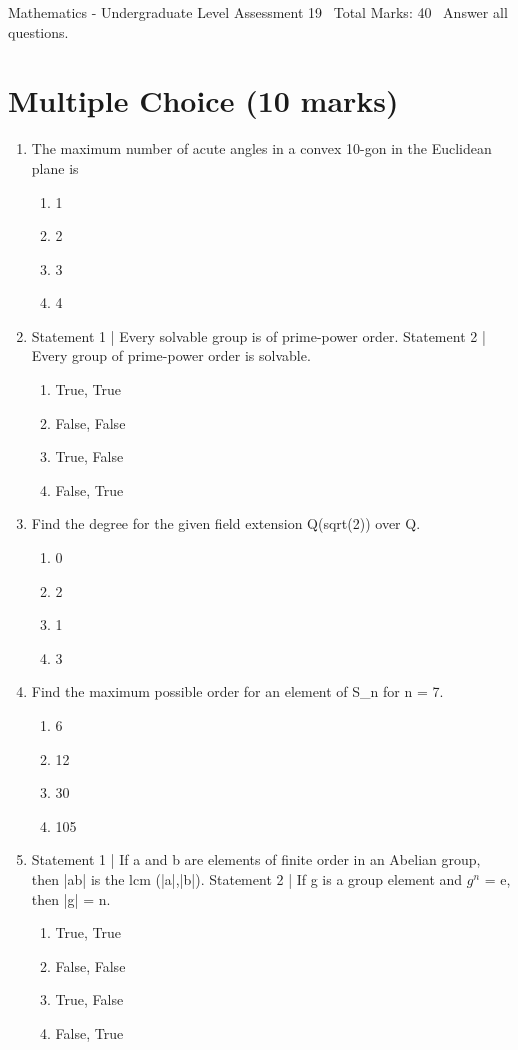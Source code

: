 \documentclass[12pt]{article}
\begin{document}
\begin{center}
Mathematics - Undergraduate Level Assessment 19 \
Total Marks: 40 \
Answer all questions.
\end{center}

\section*{Multiple Choice (10 marks)}
\begin{enumerate}[label=\arabic*.]
\item The maximum number of acute angles in a convex 10-gon in the Euclidean plane is
\begin{enumerate}[label=(\alph*)]
    \item 1
    \item 2
    \item 3
    \item 4
\end{enumerate}
\item Statement 1 | Every solvable group is of prime-power order. Statement 2 | Every group of prime-power order is solvable.
\begin{enumerate}[label=(\alph*)]
    \item True, True
    \item False, False
    \item True, False
    \item False, True
\end{enumerate}
\item Find the degree for the given field extension Q(sqrt(2)) over Q.
\begin{enumerate}[label=(\alph*)]
    \item 0
    \item 2
    \item 1
    \item 3
\end{enumerate}
\item Find the maximum possible order for an element of S\_n for n = 7.
\begin{enumerate}[label=(\alph*)]
    \item 6
    \item 12
    \item 30
    \item 105
\end{enumerate}
\item Statement 1 | If a and b are elements of finite order in an Abelian group, then |ab| is the lcm (|a|,|b|). Statement 2 | If g is a group element and $g^n$ = e, then |g| = n.
\begin{enumerate}[label=(\alph*)]
    \item True, True
    \item False, False
    \item True, False
    \item False, True
\end{enumerate}
\end{enumerate}
\end{document}
